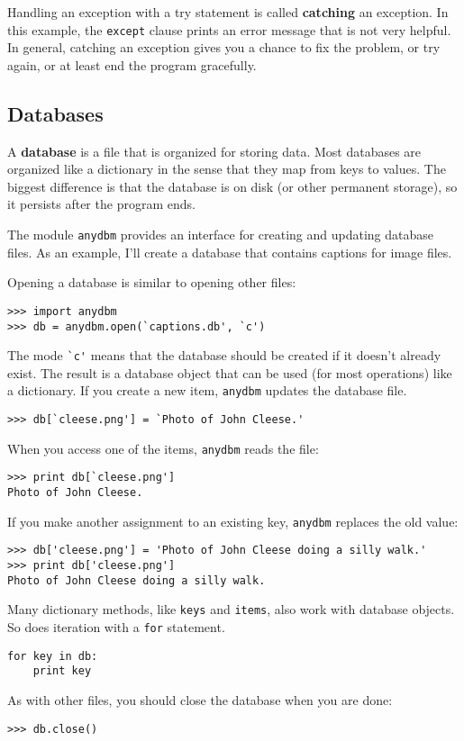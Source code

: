 \documentclass{article}
\begin{document}
Handling an exception with a try statement is called {\bf catching} an
exception. In this example, the \verb|except| clause prints an error message
that is not very helpful. In general, catching an exception gives you
a chance to fix the problem, or try again, or at least end the program
gracefully.

\subsection{Databases}
A {\bf database} is a file that is organized for storing data. Most
databases are organized like a dictionary in the sense that they map
from keys to values. The biggest difference is that the database is on
disk (or other permanent storage), so it persists after the program
ends.

The module \verb|anydbm| provides an interface for creating and
updating database files. As an example, I'll create a database that
contains captions for image files.

Opening a database is similar to opening other files:
\begin{verbatim}
>>> import anydbm
>>> db = anydbm.open(`captions.db', `c')
\end{verbatim}
The mode \verb|`c'| means that the database should be created if it
doesn't already exist. The result is a database object that can be
used (for most operations) like a dictionary. If you create a new
item, \verb|anydbm| updates the database file.
\begin{verbatim}
>>> db[`cleese.png'] = `Photo of John Cleese.'
\end{verbatim}
When you access one of the items, \verb|anydbm| reads the file:
\begin{verbatim}
>>> print db[`cleese.png']
Photo of John Cleese.
\end{verbatim}
If you make another assignment to an existing key, \verb|anydbm|
replaces the old value:
\begin{verbatim}
>>> db['cleese.png'] = 'Photo of John Cleese doing a silly walk.'
>>> print db['cleese.png']
Photo of John Cleese doing a silly walk.
\end{verbatim}
Many dictionary methods, like \verb|keys| and \verb|items|, also work
with database objects. So does iteration with a \verb|for| statement.
\begin{verbatim}
for key in db:
    print key
\end{verbatim}
As with other files, you should close the database when you are done:
\begin{verbatim}
>>> db.close()
\end{verbatim}
\end{document}
